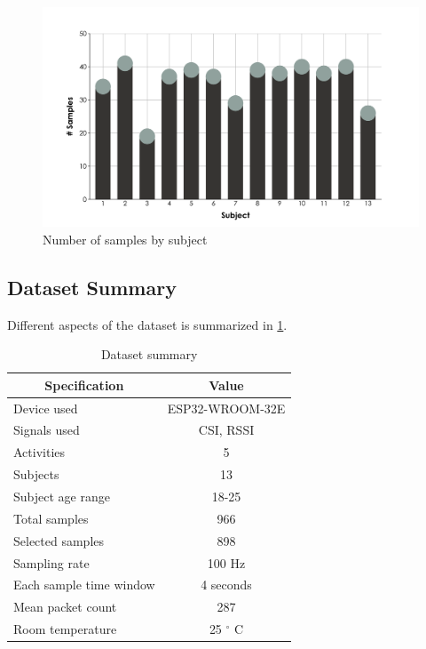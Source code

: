 \begin{figure}[H]
\centering
\includegraphics[width=1.0\textwidth]{./figure/chap 4/subjectwise_data_counts}
\caption{Number of samples by subject}
\label{Fig 4.10}
\end{figure}

\subsection{Dataset Summary}
Different aspects of the dataset is summarized in \ref{Table 4.3}.

\begin{table}[H]
\caption{Dataset summary}
\vspace{2mm}
\centering
\begin{tabular}{|l|c|} 
\hline
\multicolumn{1}{|c|}{\textbf{Specification}} & \multicolumn{1}{c|}{\textbf{Value}}                                                      \\ 
\hline
Device used             & ESP32-WROOM-32E             \\
Signals used            & CSI, RSSI                   \\
Activities              & 5                           \\
Subjects                & 13                          \\
Subject age range       & 18-25                       \\
Total samples           & 966                         \\
Selected samples        & 898                         \\
Sampling rate           & 100 Hz                      \\
Each sample time window & 4 seconds                   \\
Mean packet count       & 287                         \\
Room temperature        & 25 $^{\circ}$ C             \\
\hline
\end{tabular}
\label{Table 4.3}
\end{table}



